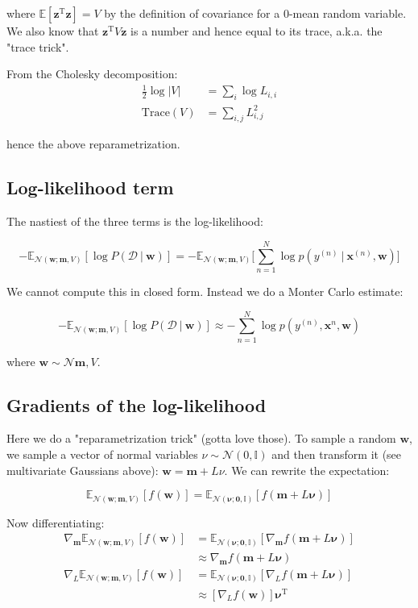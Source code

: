 \documentclass{article}
\newcommand{\bm}[1]{\mathbf{#1}}
\newcommand{\vf}[1]{\mathbf{#1}}
\newcommand{\normal}{\mathcal{N}}
\newcommand{\bx}{\vf{x}}
\newcommand{\bz}{\vf{z}}
\newcommand{\bw}{\vf{w}}
\newcommand{\giv}{\ |\ }
\newcommand{\data}{\mathcal{D}}
\newcommand{\tran}{\text{T}}
\newcommand{\expect}{\mathbb{E}}
\begin{document}
where $\expect[\bz^\tran \bz] = V$ by the definition of covariance for a $0$-mean random variable. We also know that $\bz^\tran V \bz$ is a number and hence equal to its trace, a.k.a. the "trace trick".
\vskip 0.1in

From the Cholesky decomposition:
\begin{align*}
    \frac{1}{2} \log|V| &= \sum_i \log L_{i,i} \\
    \text{Trace}(V) &= \sum_{i,j} L_{i,j}^2
\end{align*}

hence the above reparametrization.

\subsection{Log-likelihood term}
The nastiest of the three terms is the log-likelihood:

\begin{equation*}
    -\expect_{\normal(\bw; \bm{m}, V)}[\log P(\data \giv \bw)] =
        -\expect_{\normal(\bw; \bm{m}, V)}\bigg[
            \sum_{n=1}^N \log p(y^{(n)} \giv \bx^{(n)}, \bw)
        \bigg]
\end{equation*}

We cannot compute this in closed form. Instead we do a Monter Carlo estimate:

\begin{equation*}
    -\expect_{\normal(\bw; \bm{m}, V)}[\log P(\data \giv \bw)] \approx
        - \sum_{n = 1}^{N} \log p(y^{(n)}, \bx^{n}, \bw)
\end{equation*}

where $\bw \sim \normal{\bm{m}, V}$.

\subsection{Gradients of the log-likelihood}
Here we do a "reparametrization trick" (gotta love those). To sample a random $\bw$, we sample a vector of normal variables $\nu \sim \normal(0, \mathbb{I})$ and then transform it (see multivariate Gaussians above): $\bw = \bm{m} + L \nu$. We can rewrite the expectation:

\begin{equation*}
    \expect_{\normal(\bw; \bm{m}, V)}[f(\bw)] = \expect_{\normal(\pmb{\nu}; \bm{0}, \mathbb{I})}[f(\bm{m} + L \pmb{\nu})]
\end{equation*}

Now differentiating:
\begin{align*}
    \nabla_\bm{m} \expect_{\normal(\bw; \bm{m}, V)}[f(\bw)] &=
    \expect_{\normal(\pmb{\nu}; \bm{0}, \mathbb{I})}[\nabla_\bm{m} f(\bm{m} + L \pmb{\nu})] \\
    &\approx \nabla_\bm{m} f(\bm{m} + L \pmb{\nu}) \\
    \nabla_L \expect_{\normal(\bw; \bm{m}, V)}[f(\bw)] &=
    \expect_{\normal(\pmb{\nu}; \bm{0}, \mathbb{I})}[\nabla_L f(\bm{m} + L \pmb{\nu})] \\
    &\approx [\nabla_L f(\bw)]\pmb{\nu}^\tran
\end{align*}
\end{document}
